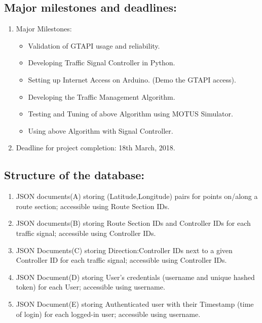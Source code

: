 \documentclass[12pt,a4paper,final]{report}
\begin{document}
\subsection{Major milestones and deadlines:}
\begin{enumerate}
	\item
		Major Milestones:
		\begin{itemize}
			\item Validation of GTAPI usage and reliability.
			\item Developing Traffic Signal Controller in Python.
			\item Setting up Internet Access on Arduino. (Demo the GTAPI access).
			\item Developing the Traffic Management Algorithm.
			\item Testing and Tuning of above Algorithm using MOTUS Simulator.
			\item Using above Algorithm with Signal Controller.
		\end{itemize}
    \item
    Deadline for project completion: 18th March, 2018.
\end{enumerate}
\subsection{Structure of the database: }
\begin{enumerate}
    \item
	    JSON documents(A) storing (Latitude,Longitude) pairs for points on/along a route section; accessible using Route Section IDs.
   	\item
   		JSON documents(B) storing Route Section IDs and Controller IDs for each traffic signal; accessible using Controller IDs.
   	\item
   		JSON Documents(C) storing Direction:Controller IDs next to a given Controller ID for each traffic signal; accessible using Controller IDs.
   	\item
   		JSON Document(D) storing User's credentials (username and unique hashed token) for each User; accessible using username.
   	\item
   		JSON Document(E) storing Authenticated user with their Timestamp (time of login) for each logged-in user; accessible using username.
\end{enumerate}

\newpage
\end{document}
